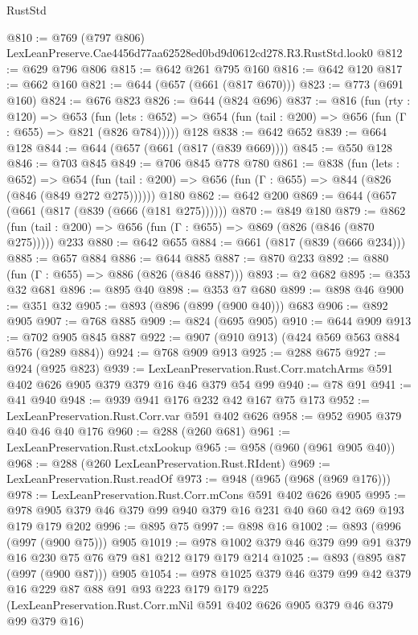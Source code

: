 \begin{lexlean}{RustStd}
\begin{coremodule}
@810 := @769 (@797 @806) LexLeanPreserve.Cae4456d77aa62528ed0bd9d0612cd278.R3.RustStd.look0
@812 := @629 @796 @806
@815 := @642 @261 @795 @160
@816 := @642 @120
@817 := @662 @160
@821 := @644 (@657 (@661 (@817 @670)))
@823 := @773 (@691 @160)
@824 := @676 @823
@826 := @644 (@824 @696)
@837 := @816
    (fun (rty : @120) =>
    @653
      (fun (lets : @652) => @654 (fun (tail : @200) => @656 (fun (Γ : @655) => @821 (@826 @784)))))
    @128
@838 := @642 @652
@839 := @664 @128
@844 := @644 (@657 (@661 (@817 (@839 @669))))
@845 := @550 @128
@846 := @703 @845
@849 := @706 @845 @778 @780
@861 := @838
    (fun (lets : @652) =>
    @654 (fun (tail : @200) => @656 (fun (Γ : @655) => @844 (@826 (@846 (@849 @272 @275))))))
    @180
@862 := @642 @200
@869 := @644 (@657 (@661 (@817 (@839 (@666 (@181 @275))))))
@870 := @849 @180
@879 := @862 (fun (tail : @200) => @656 (fun (Γ : @655) => @869 (@826 (@846 (@870 @275))))) @233
@880 := @642 @655
@884 := @661 (@817 (@839 (@666 @234)))
@885 := @657 @884
@886 := @644 @885
@887 := @870 @233
@892 := @880 (fun (Γ : @655) => @886 (@826 (@846 @887)))
@893 := @2 @682
@895 := @353 @32 @681
@896 := @895 @40
@898 := @353 @7 @680
@899 := @898 @46
@900 := @351 @32
@905 := @893 (@896 (@899 (@900 @40))) @683
@906 := @892 @905
@907 := @768 @885
@909 := @824 (@695 @905)
@910 := @644 @909
@913 := @702 @905 @845 @887
@922 := @907 (@910 @913) (@424 @569 @563 @884 @576 (@289 @884))
@924 := @768 @909 @913
@925 := @288 @675
@927 := @924 (@925 @823)
@939 := LexLeanPreservation.Rust.Corr.matchArms @591 @402 @626 @905 @379 @379 @16 @46 @379 @54 @99
@940 := @78 @91
@941 := @41 @940
@948 := @939 @941 @176 @232 @42 @167 @75 @173
@952 := LexLeanPreservation.Rust.Corr.var @591 @402 @626
@958 := @952 @905 @379 @40 @46 @40 @176
@960 := @288 (@260 @681)
@961 := LexLeanPreservation.Rust.ctxLookup
@965 := @958 (@960 (@961 @905 @40))
@968 := @288 (@260 LexLeanPreservation.Rust.RIdent)
@969 := LexLeanPreservation.Rust.readOf
@973 := @948 (@965 (@968 (@969 @176)))
@978 := LexLeanPreservation.Rust.Corr.mCons @591 @402 @626 @905
@995 := @978 @905 @379 @46 @379 @99 @940 @379 @16 @231 @40 @60 @42 @69 @193 @179 @179 @202
@996 := @895 @75
@997 := @898 @16
@1002 := @893 (@996 (@997 (@900 @75))) @905
@1019 := @978 @1002 @379 @46 @379 @99 @91 @379 @16 @230 @75 @76 @79 @81 @212 @179 @179 @214
@1025 := @893 (@895 @87 (@997 (@900 @87))) @905
@1054 := @978
    @1025
    @379
    @46
    @379
    @99
    @42
    @379
    @16
    @229
    @87
    @88
    @91
    @93
    @223
    @179
    @179
    @225
    (LexLeanPreservation.Rust.Corr.mNil @591 @402 @626 @905 @379 @46 @379 @99 @379 @16)

\end{coremodule}
\end{lexlean}
